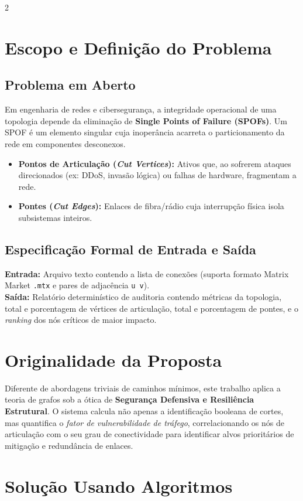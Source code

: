 \documentclass[10pt,a4paper]{article}
\begin{document}
\begin{multicols}{2}
\section{Escopo e Definição do Problema}
\subsection{Problema em Aberto}
Em engenharia de redes e cibersegurança, a integridade operacional de uma topologia depende da eliminação de \textbf{Single Points of Failure (SPOFs)}. Um SPOF é um elemento singular cuja inoperância acarreta o particionamento da rede em componentes desconexos.
\begin{itemize}
    \setlength{\itemsep}{0pt}
    \item \textbf{Pontos de Articulação (\textit{Cut Vertices}):} Ativos que, ao sofrerem ataques direcionados (ex: DDoS, invasão lógica) ou falhas de hardware, fragmentam a rede.
    \item \textbf{Pontes (\textit{Cut Edges}):} Enlaces de fibra/rádio cuja interrupção física isola subsistemas inteiros.
\end{itemize}

\subsection{Especificação Formal de Entrada e Saída}
\textbf{Entrada:} Arquivo texto contendo a lista de conexões (suporta formato Matrix Market \texttt{.mtx} e pares de adjacência \texttt{u v}).\\
\textbf{Saída:} Relatório determinístico de auditoria contendo métricas da topologia, total e porcentagem de vértices de articulação, total e porcentagem de pontes, e o \textit{ranking} dos nós críticos de maior impacto.

\section{Originalidade da Proposta}
Diferente de abordagens triviais de caminhos mínimos, este trabalho aplica a teoria de grafos sob a ótica de \textbf{Segurança Defensiva e Resiliência Estrutural}. O sistema calcula não apenas a identificação booleana de cortes, mas quantifica o \textit{fator de vulnerabilidade de tráfego}, correlacionando os nós de articulação com o seu grau de conectividade para identificar alvos prioritários de mitigação e redundância de enlaces.

\section{Solução Usando Algoritmos}

\end{multicols}
\end{document}
